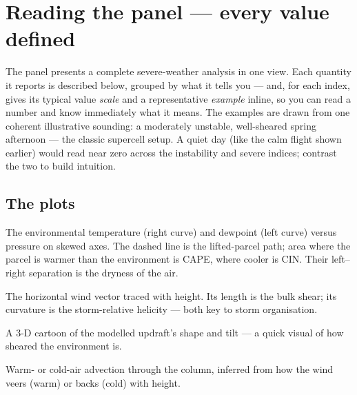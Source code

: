 \documentclass[11pt,openany]{report}
\begin{document}
\section{Reading the panel --- every value defined}
The panel presents a complete severe-weather analysis in one view. Each quantity it
reports is described below, grouped by what it tells you --- and, for each index, gives
its typical value \emph{scale} and a representative \emph{example} inline, so you can
read a number and know immediately what it means. The examples are drawn from one
coherent illustrative sounding: a moderately unstable, well-sheared spring afternoon ---
the classic supercell setup. A quiet day (like the calm flight shown earlier) would read
near zero across the instability and severe indices; contrast the two to build intuition.

\subsection{The plots}
\begin{description}[leftmargin=3.4cm,style=nextline]
  \item[Skew-T log-P] The environmental temperature (right curve) and dewpoint (left curve)
        versus pressure on skewed axes. The dashed line is the lifted-parcel path; area where the
        parcel is warmer than the environment is CAPE, where cooler is CIN. Their left--right
        separation is the dryness of the air.
  \item[Hodograph] The horizontal wind vector traced with height. Its length is the bulk shear;
        its curvature is the storm-relative helicity --- both key to storm organisation.
  \item[Storm Slinky] A 3-D cartoon of the modelled updraft's shape and tilt --- a quick visual of
        how sheared the environment is.
  \item[Inferred Temp.\ Advection] Warm- or cold-air advection through the column, inferred from how
        the wind veers (warm) or backs (cold) with height.
\end{description}
\end{document}
